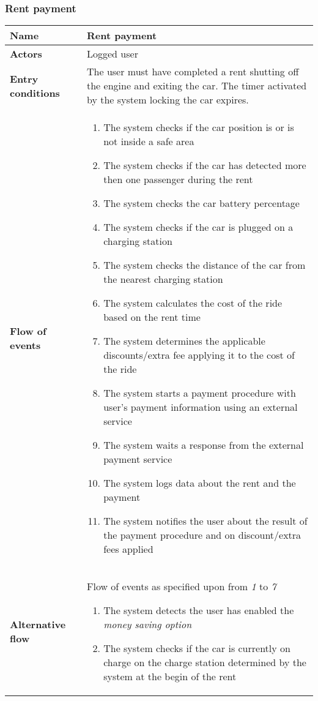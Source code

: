 \subsubsection{Rent payment}
\begin{longtable}{p{0.25\linewidth}p{0.75\linewidth}}
\toprule
\textbf{Name} & \textbf{Rent payment} \\
\midrule
\textbf{Actors} &  Logged user\\
\midrule
\textbf{Entry conditions} & 
The user must have completed a rent shutting off the engine and exiting the car. The timer activated by the system locking the car expires. \\
\midrule
\textbf{Flow of events} & 
\begin{enumerate}
	\item The system checks if the car position is or is not inside a safe area
	\item The system checks if the car has detected more then one passenger during the rent
	\item The system checks the car battery percentage
	\item The system checks if the car is plugged on a charging station
	\item The system checks the distance of the car from the nearest charging station
	\item The system calculates the cost of the ride based on the rent time
	\item The system determines the applicable discounts/extra fee applying it to the cost of the ride
	\item The system starts a payment procedure with user's payment information using
	an external service
	\item The system waits a response from the external payment service
	\item The system logs data about the rent and the payment
    \item The system notifies the user about the result of the payment procedure and on discount/extra fees applied
\end{enumerate} \\
\midrule
\textbf{Alternative flow} & 
Flow of events as specified upon from \emph{1} to \emph{7}
\begin{enumerate}[label=8 \alph*.]
	\item The system detects the user has enabled the \emph{money saving option}
	\item The system checks if the car is currently on charge on the charge station determined by the system at the begin of the rent

\end{enumerate}
\end{longtable}
